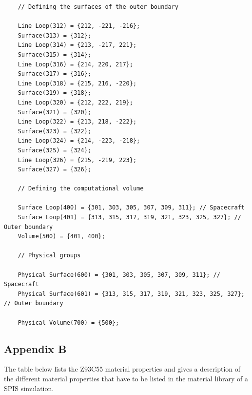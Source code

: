 \documentclass[a4paper, 11pt]{article}
\begin{document}
\begin{verbatim}
    // Defining the surfaces of the outer boundary

    Line Loop(312) = {212, -221, -216};
    Surface(313) = {312};
    Line Loop(314) = {213, -217, 221};
    Surface(315) = {314};
    Line Loop(316) = {214, 220, 217};
    Surface(317) = {316};
    Line Loop(318) = {215, 216, -220};
    Surface(319) = {318};
    Line Loop(320) = {212, 222, 219};
    Surface(321) = {320};
    Line Loop(322) = {213, 218, -222};
    Surface(323) = {322};
    Line Loop(324) = {214, -223, -218};
    Surface(325) = {324};
    Line Loop(326) = {215, -219, 223};
    Surface(327) = {326};

    // Defining the computational volume

    Surface Loop(400) = {301, 303, 305, 307, 309, 311}; // Spacecraft
    Surface Loop(401) = {313, 315, 317, 319, 321, 323, 325, 327}; // Outer boundary
    Volume(500) = {401, 400};

    // Physical groups

    Physical Surface(600) = {301, 303, 305, 307, 309, 311}; // Spacecraft
    Physical Surface(601) = {313, 315, 317, 319, 321, 323, 325, 327}; // Outer boundary

    Physical Volume(700) = {500};

\end{verbatim}

\subsection{Appendix B}

The table below lists the Z93C55 material properties and gives a description of the different material properties that have to be listed in the material library of a SPIS simulation.
\end{document}
